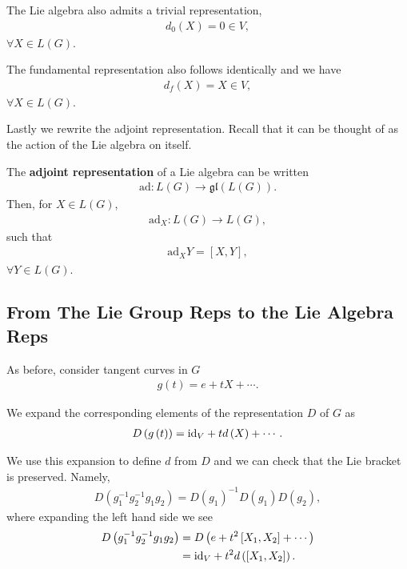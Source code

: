 
\newcommand{\ad}{\text{ad}}

The Lie algebra also admits a trivial representation,
\begin{align}
    d_0 \left( X \right) = 0 \in V
,\end{align}
$\forall X \in L \left( G \right) $.

The fundamental representation also follows identically and we have
\begin{align}
    d_f \left( X \right) = X \in V
,\end{align}
$\forall X \in L \left( G \right) $.

Lastly we rewrite the adjoint representation. Recall that it can be thought of as the action of the Lie algebra on itself.

\begin{definition}
    The \textbf{adjoint representation} of a Lie algebra can be written
    \begin{align}
        \ad : L \left( G \right) \to \mathfrak{gl}\left( L\left( G \right)  \right) 
    .\end{align}
    Then, for $X \in L \left( G \right) $,
    \begin{align}
        \ad_X : L \left( G \right) \to L \left( G \right) 
    ,\end{align}
    such that
    \begin{align}
        \ad_X Y = \left[ X, Y \right] 
    ,\end{align}
    $\forall Y \in L \left( G \right) $.
\end{definition}

\subsection{From The Lie Group Reps to the Lie Algebra Reps}

As before, consider tangent curves in $G$
\begin{align}
    g \left( t \right) = e + t X + \cdots
.\end{align}

We expand the corresponding elements of the representation $D$ of $G$ as
\begin{align}
    D \left( g \left( t \right)  \right) = \text{id}_V + t d \left( X \right) + \cdots
.\end{align}

We use this expansion to define $d$ from $D$ and we can check that the Lie bracket is preserved. Namely,
\begin{align}\label{eq:rep_expansion}
    D \left( g_1^{-1} g_2^{-1} g_1 g_2 \right) = D\left( g_1 \right)^{-1} D \left( g_1 \right) D \left( g_2 \right) 
,\end{align}
where expanding the left hand side we see
\begin{align}
      D \left( g_1^{-1} g_2^{-1} g_1 g_2 \right) &= D\left( e + t^2 \left[ X_1, X_2 \right] + \cdots \right)  \\
      &= \text{id}_V + t^2 d \left( \left[ X_1, X_2 \right]  \right) 
.\end{align}

